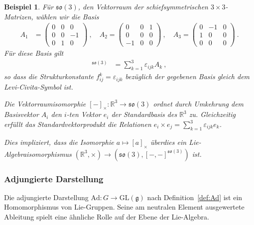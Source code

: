 \documentclass[10pt,a4paper]{article}
\theoremstyle{mytheorem}
\theoremstyle{mydefinition}
\newtheorem{example}[theorem]{Beispiel}
\newcommand{\Ad}{\mathrm{Ad}}
\newcommand{\fso}{\mathfrak{so}}
\begin{document}
\begin{example}
\label{ex:so3base}
Für $\fso(3)$, den Vektorraum der schiefsymmetrischen $3\times 3$-Matrizen, wählen wir die Basis
\begin{align*}
A_1 &=
\begin{pmatrix}
0 & 0 & 0 \\
0 & 0 & -1 \\
0 & 1 & 0
\end{pmatrix}
\ ,\quad
A_2 =
\begin{pmatrix}
0 & 0 & 1 \\
0 & 0 & 0 \\
-1& 0 & 0
\end{pmatrix}
\ ,\quad
A_3 =
\begin{pmatrix}
0 & -1 & 0 \\
1 & 0 & 0 \\
0 & 0 & 0
\end{pmatrix}
\ .
\end{align*}
Für diese Basis gilt
\begin{align*}
[A_i,A_j]^{\fso(3)} &= \sum_{k=1}^3 \varepsilon_{ijk} A_k
\ ,
\end{align*}
so dass die Strukturkonstante $f^k_{ij}=\varepsilon_{ijk}$ bezüglich der gegebenen Basis gleich dem Levi-Civita-Symbol ist.

Die Vektorraumisomorphie $[-]_\times:\mathbb{R}^3\rightarrow\fso(3)$ ordnet durch Umkehrung dem Basisvektor $A_i$ den $i$-ten Vektor $e_i$ der Standardbasis des $\mathbb{R}^3$ zu.
Gleichzeitig erfüllt das Standardvektorprodukt die Relationen $e_i\times e_j=\sum_{k=1}^3 \varepsilon_{ijk}e_k$.

Dies impliziert, dass die Isomorphie $a\mapsto[a]_\times$ überdies ein Lie-Algebraisomorphismus $(\mathbb{R}^3,\times)\rightarrow(\fso(3), [-,-]^{\fso(3)})$ ist.
\end{example}
	
\subsubsection{Adjungierte Darstellung}

Die adjungierte Darstellung $\Ad:G\rightarrow\mathrm{GL}(\mathfrak{g})$ nach Definition~\ref{def:Ad} ist ein Homomorphismus von Lie-Gruppen.
Seine am neutralen Element ausgewertete Ableitung spielt eine ähnliche Rolle auf der Ebene der Lie-Algebra.
\end{document}

